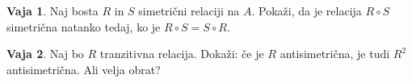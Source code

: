 \documentclass{article}
\theoremstyle{definition}
\newtheorem{vaja}{Vaja}
\begin{document}
\begin{vaja}
Naj bosta $R$ in $S$ simetrični relaciji na $A$. Pokaži, da je relacija $R\circ S$ simetrična natanko tedaj, ko je $R\circ S = S\circ R$.
\end{vaja}

\begin{vaja}
Naj bo $R$ tranzitivna relacija. Dokaži: če je $R$ antisimetrična, je tudi $R^2$ antisimetrična. Ali velja obrat?
\end{vaja}
\end{document}
